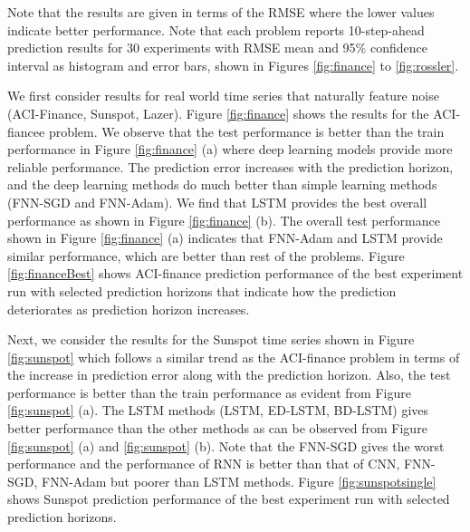 \documentclass[final,5p,times,twocolumn]{elsarticle}
\begin{document}
 


Note that the results are given in terms of the RMSE where the lower values indicate better performance. Note that each problem reports 10-step-ahead prediction results for 30 experiments  with RMSE mean and 95\% confidence interval  as histogram and error bars, shown in Figures \ref{fig:finance} to \ref{fig:rossler}. 


  We first consider results for real world time series that naturally feature noise (ACI-Finance, Sunspot, Lazer). Figure \ref{fig:finance} shows the results for the ACI-fiancee problem. We observe that the test performance is better than the train performance in Figure \ref{fig:finance} (a) where deep learning models provide more reliable performance. The prediction error increases with the prediction horizon, and the deep learning methods do much better than simple learning methods (FNN-SGD and FNN-Adam). We find that LSTM provides the best overall   performance as shown in Figure \ref{fig:finance} (b).  The overall test performance shown in Figure \ref{fig:finance} (a) indicates that FNN-Adam  and  LSTM  provide similar performance, which are better than rest of the problems.  Figure \ref{fig:financeBest} shows ACI-finance prediction performance of the best experiment run with selected prediction horizons that indicate how the prediction deteriorates  as prediction horizon increases. 

Next, we consider the results for the  Sunspot time series  shown in Figure \ref{fig:sunspot} which follows a similar trend as the ACI-finance problem in terms of the increase in prediction error along with the prediction horizon. Also, the test performance is better than the train performance as evident from Figure \ref{fig:sunspot} (a). The LSTM methods (LSTM, ED-LSTM, BD-LSTM) gives better performance than the other methods as can be observed from Figure \ref{fig:sunspot} (a) and \ref{fig:sunspot} (b). Note that the FNN-SGD gives the worst performance and the performance of RNN is better than that of CNN, FNN-SGD, FNN-Adam but poorer than LSTM methods. Figure \ref{fig:sunspotsingle}  shows Sunspot prediction performance of the best experiment run with selected prediction horizons. 
\end{document}
